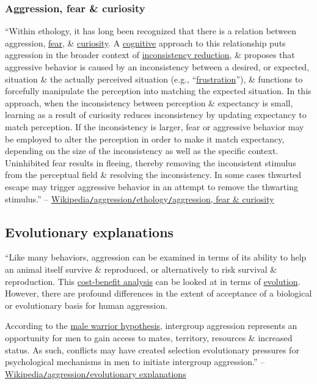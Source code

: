 \documentclass[oneside]{book}
\numberwithin{equation}{section}
\begin{document}
\subsubsection{Aggression, fear \& curiosity}
``Within ethology, it has long been recognized that there is a relation between aggression, \href{https://en.wikipedia.org/wiki/Fear}{fear}, \& \href{https://en.wikipedia.org/wiki/Curiosity}{curiosity}. A \href{https://en.wikipedia.org/wiki/Cognitive_science}{cognitive} approach to this relationship puts aggression in the broader context of \href{https://en.wikipedia.org/wiki/Cognitive_dissonance}{inconsistency reduction}, \& proposes that aggressive behavior is caused by an inconsistency between a desired, or expected, situation \& the actually perceived situation (e.g., ``\href{https://en.wikipedia.org/wiki/Frustration%E2%80%93aggression_hypothesis}{frustration}''), \& functions to forcefully manipulate the perception into matching the expected situation. In this approach, when the inconsistency between perception \& expectancy is small, learning as a result of curiosity reduces inconsistency by updating expectancy to match perception. If the inconsistency is larger, fear or aggressive behavior may be employed to alter the perception in order to make it match expectancy, depending on the size of the inconsistency as well as the specific context. Uninhibited fear results in fleeing, thereby removing the inconsistent stimulus from the perceptual field \& resolving the inconsistency. In some cases thwarted escape may trigger aggressive behavior in an attempt to remove the thwarting stimulus.'' -- \href{https://en.wikipedia.org/wiki/Aggression#Aggression,_fear_and_curiosity}{Wikipedia\texttt{/}aggression\texttt{/}ethology\texttt{/}aggression, fear \& curiosity}

\subsection{Evolutionary explanations}
``Like many behaviors, aggression can be examined in terms of its ability to help an animal itself survive \& reproduced, or alternatively to risk survival \& reproduction. This \href{https://en.wikipedia.org/wiki/Cost-benefit_analysis}{cost-benefit analysis} can be looked at in terms of \href{https://en.wikipedia.org/wiki/Evolution}{evolution}. However, there are profound differences in the extent of acceptance of a biological or evolutionary basis for human aggression.

According to the \href{https://en.wikipedia.org/wiki/Male_warrior_hypothesis}{male warrior hypothesis}, intergroup aggression represents an opportunity for men to gain access to mates, territory, resources \& increased status. As such, conflicts may have created selection evolutionary pressures for psychological mechanisms in men to initiate intergroup aggression.'' -- \href{https://en.wikipedia.org/wiki/Aggression#Evolutionary_explanations}{Wikipedia\texttt{/}aggression\texttt{/}evolutionary explanations}
\end{document}
